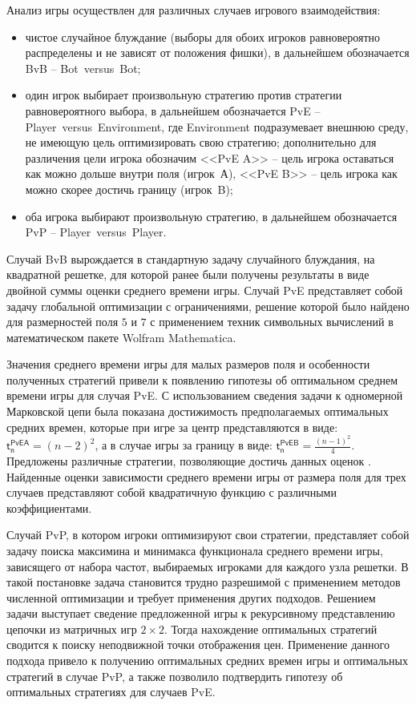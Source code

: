 Анализ игры осуществлен для различных случаев игрового взаимодействия: 
\begin{itemize}
    \item чистое случайное блуждание (выборы для обоих игроков равновероятно распределены и не зависят от положения фишки), в дальнейшем обозначается BvB -- Bot~versus~Bot;
    \item один игрок выбирает произвольную стратегию против стратегии равновероятного выбора, в дальнейшем обозначается PvE -- Player~versus~Environment, где Environment подразумевает внешнюю среду, не имеющую цель оптимизировать свою стратегию; дополнительно для различения цели игрока обозначим <<PvE A>> -- цель игрока оставаться как можно дольше внутри поля (игрок~А), <<PvE B>> -- цель игрока как можно скорее достичь границу (игрок~B);
    \item оба игрока выбирают произвольную стратегию, в дальнейшем обозначается PvP -- Player~versus~Player.
\end{itemize}

Случай BvB вырождается в стандартную задачу случайного блуждания, на квадратной решетке, для которой ранее были получены результаты в виде двойной суммы оценки среднего времени игры. Случай PvE представляет собой задачу глобальной оптимизации с ограничениями, решение которой было найдено для размерностей поля $5$ и $7$ с применением техник символьных вычислений в математическом пакете Wolfram Mathematica. 

Значения среднего времени игры для малых размеров поля и особенности полученных стратегий привели к появлению гипотезы об оптимальном среднем времени игры для случая PvE. С использованием сведения задачи к одномерной Марковской цепи была показана достижимость предполагаемых оптимальных средних времен, которые при игре за центр представляются в виде: $\boldsymbol{\mathsf{t_n^{PvE A}}} = (n-2)^2$, а в случае игры за границу в виде: $\boldsymbol{\mathsf{t_n^{PvE B}}} = \frac{(n-1)^2}{4}$. Предложены различные стратегии, позволяющие достичь данных оценок \cite{confbib1}. Найденные оценки зависимости среднего времени игры от размера поля для трех случаев представляют собой квадратичную функцию с различными коэффициентами.

Случай PvP, в котором игроки оптимизируют свои стратегии, представляет собой задачу поиска максимина и минимакса функционала среднего времени игры, зависящего от набора частот, выбираемых игроками для каждого узла решетки. В такой постановке задача становится трудно разрешимой с применением методов численной оптимизации и требует применения других подходов. Решением задачи выступает сведение предложенной игры к рекурсивному представлению цепочки из матричных игр $2 \times 2$. Тогда нахождение оптимальных стратегий сводится к поиску неподвижной точки отображения цен. Применение данного подхода привело к получению оптимальных средних времен игры и оптимальных стратегий в случае PvP, а также позволило подтвердить гипотезу об оптимальных стратегиях для случаев PvE.


